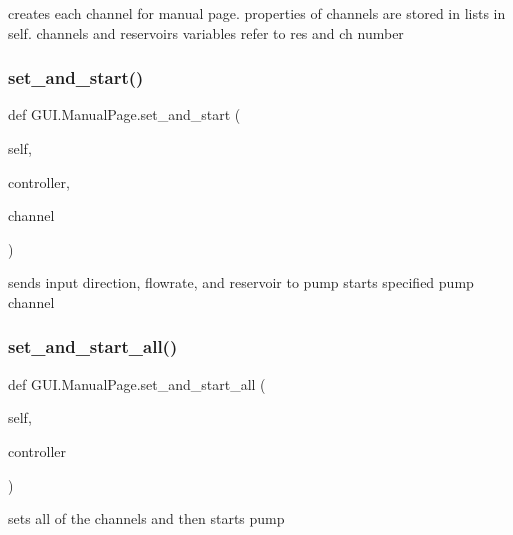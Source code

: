 \begin{DoxyVerb}creates each channel for manual page. properties of channels are stored in lists in self.
channels and reservoirs variables refer to res and ch number
\end{DoxyVerb}
 \mbox{\label{class_g_u_i_1_1_manual_page_af00991d5107b8b590f222c7c5a82c8d9}} 
\subsubsection{\texorpdfstring{set\_and\_start()}{set\_and\_start()}}
{\footnotesize\ttfamily def G\+U\+I.\+Manual\+Page.\+set\+\_\+and\+\_\+start (\begin{DoxyParamCaption}\item[{}]{self,  }\item[{}]{controller,  }\item[{}]{channel }\end{DoxyParamCaption})}

\begin{DoxyVerb}sends input direction, flowrate, and reservoir to pump
starts specified pump channel
\end{DoxyVerb}
 \mbox{\label{class_g_u_i_1_1_manual_page_a9c7c4c6f8b8811f2c88841419faa2cc2}} 
\subsubsection{\texorpdfstring{set\_and\_start\_all()}{set\_and\_start\_all()}}
{\footnotesize\ttfamily def G\+U\+I.\+Manual\+Page.\+set\+\_\+and\+\_\+start\+\_\+all (\begin{DoxyParamCaption}\item[{}]{self,  }\item[{}]{controller }\end{DoxyParamCaption})}

\begin{DoxyVerb}sets all of the channels and then starts pump
\end{DoxyVerb}
 \mbox{\label{class_g_u_i_1_1_manual_page_a14d88e9b478d9bb8828c0639dd258d1e}} 

